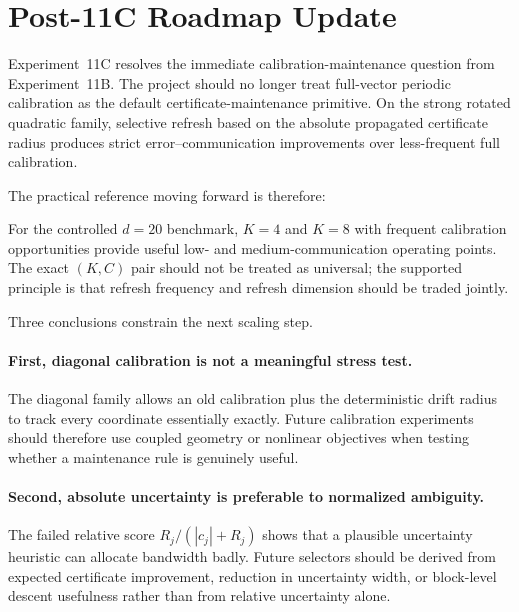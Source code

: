 \section{Post-11C Roadmap Update}
\label{sec:post11c}

Experiment~11C resolves the immediate calibration-maintenance question from Experiment~11B. The project should no longer treat full-vector periodic calibration as the default certificate-maintenance primitive. On the strong rotated quadratic family, selective refresh based on the absolute propagated certificate radius produces strict error--communication improvements over less-frequent full calibration.

The practical reference moving forward is therefore:
\begin{center}
\end{center}
For the controlled $d=20$ benchmark, $K=4$ and $K=8$ with frequent calibration opportunities provide useful low- and medium-communication operating points. The exact $(K,C)$ pair should not be treated as universal; the supported principle is that refresh frequency and refresh dimension should be traded jointly.

Three conclusions constrain the next scaling step.

\paragraph{First, diagonal calibration is not a meaningful stress test.}
The diagonal family allows an old calibration plus the deterministic drift radius to track every coordinate essentially exactly. Future calibration experiments should therefore use coupled geometry or nonlinear objectives when testing whether a maintenance rule is genuinely useful.

\paragraph{Second, absolute uncertainty is preferable to normalized ambiguity.}
The failed relative score $R_j/(|c_j|+R_j)$ shows that a plausible uncertainty heuristic can allocate bandwidth badly. Future selectors should be derived from expected certificate improvement, reduction in uncertainty width, or block-level descent usefulness rather than from relative uncertainty alone.

